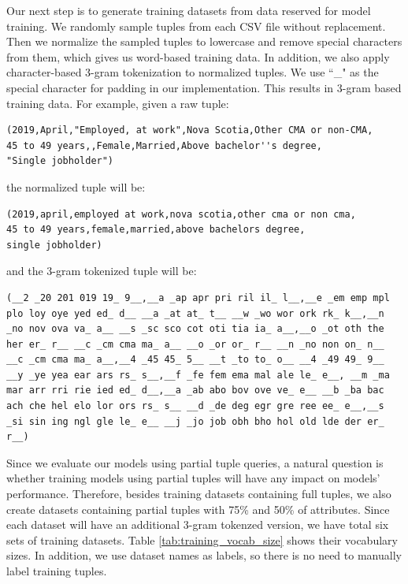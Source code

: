 \documentclass[conference]{IEEEtran}
\begin{document}
Our next step is to generate training datasets from data reserved for model training. We randomly sample tuples from each CSV file without replacement. Then we normalize the sampled tuples to lowercase and remove special characters from them, which gives us word-based training data. In addition, we also apply character-based 3-gram tokenization to normalized tuples. We use ``\_" as the special character for padding in our implementation.  This results in 3-gram based training data. For example, given a raw tuple:
\begin{verbatim}
(2019,April,"Employed, at work",Nova Scotia,Other CMA or non-CMA,
45 to 49 years,,Female,Married,Above bachelor''s degree,
"Single jobholder")
\end{verbatim}
the normalized tuple will be:
\begin{verbatim}
(2019,april,employed at work,nova scotia,other cma or non cma,
45 to 49 years,female,married,above bachelors degree,
single jobholder)
\end{verbatim}
and the 3-gram tokenized tuple will be:
\begin{verbatim}
(__2 _20 201 019 19_ 9__,__a _ap apr pri ril il_ l__,__e _em emp mpl
plo loy oye yed ed_ d__ __a _at at_ t__ __w _wo wor ork rk_ k__,__n 
_no nov ova va_ a__ __s _sc sco cot oti tia ia_ a__,__o _ot oth the 
her er_ r__ __c _cm cma ma_ a__ __o _or or_ r__ __n _no non on_ n__ 
__c _cm cma ma_ a__,__4 _45 45_ 5__ __t _to to_ o__ __4 _49 49_ 9__ 
__y _ye yea ear ars rs_ s__,__f _fe fem ema mal ale le_ e__, __m _ma
mar arr rri rie ied ed_ d__,__a _ab abo bov ove ve_ e__ __b _ba bac
ach che hel elo lor ors rs_ s__ __d _de deg egr gre ree ee_ e__,__s
_si sin ing ngl gle le_ e__ __j _jo job obh bho hol old lde der er_
r__)
\end{verbatim}
Since we evaluate our models using partial tuple queries, a natural question is whether training models using partial tuples will have any impact on models' performance. Therefore, besides training datasets containing full tuples, we also create datasets containing partial tuples with 75\% and 50\% of attributes. Since each dataset will have an additional 3-gram tokenzed version, we have total six sets of training datasets. Table \ref{tab:training_vocab_size} shows their vocabulary sizes. In addition, we use dataset names as labels, so there is no need to manually label training tuples.
\end{document}
